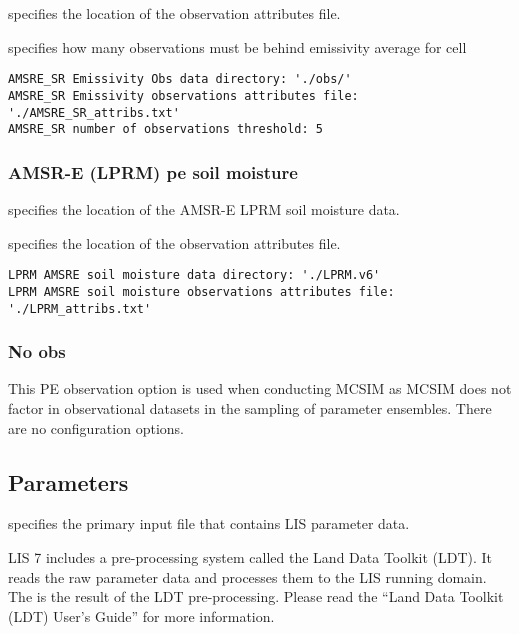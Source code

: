   specifies the location
 of the observation attributes file.

  specifies how many observations
 must be behind emissivity average for cell
 

 \begin{Verbatim}[frame=single]
AMSRE_SR Emissivity Obs data directory: './obs/'
AMSRE_SR Emissivity observations attributes file: './AMSRE_SR_attribs.txt'
AMSRE_SR number of observations threshold: 5
 \end{Verbatim}

 
 \subsubsection{AMSR-E (LPRM) pe soil moisture}
 \label{sssec:amsrelprmsm}
  specifies the location
 of the AMSR-E LPRM soil moisture data.

  specifies the location
 of the observation attributes file.
 

 \begin{Verbatim}[frame=single]
LPRM AMSRE soil moisture data directory: './LPRM.v6'
LPRM AMSRE soil moisture observations attributes file: './LPRM_attribs.txt'
 \end{Verbatim}

 
 \subsubsection{No obs}
 \label{sssec:noobs}
 This PE observation option is used when conducting MCSIM as MCSIM
 does not factor in observational datasets
 in the sampling of parameter ensembles.  There are no configuration options.
 

 
 \subsection{Parameters} \label{ssec:parameters}
 

 
  specifies the
 primary input file that contains LIS parameter data.

 LIS 7 includes a pre-processing system called the
 Land Data Toolkit (LDT).  It reads the raw parameter
 data and processes them to the LIS running domain.
 The  is the
 result of the LDT pre-processing.  Please read the
 ``Land Data Toolkit (LDT) User's Guide'' for more
 information.
 


